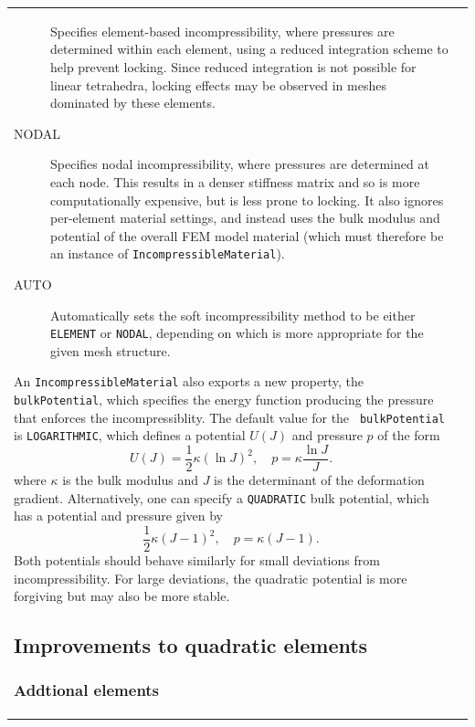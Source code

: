 \documentclass{article}
\begin{document}
\begin{tabular}{ll}
\begin{description}
Specifies element-based incompressibility,
where pressures are determined within each element, using a reduced
integration scheme to help prevent locking. Since
reduced integration is not possible for linear tetrahedra,
locking effects may be observed in meshes dominated by these elements.

\item[NODAL] \mbox{}
 
Specifies nodal incompressibility, where pressures are
determined at each node. This results in a denser stiffness
matrix and so is more computationally expensive, but is
less prone to locking. It also ignores
per-element material settings, and instead uses the bulk modulus
and potential of the overall FEM model material (which
must therefore be an instance of {\tt IncompressibleMaterial}).

\item[AUTO] \mbox{}

Automatically sets the soft incompressibility method to be either
{\tt ELEMENT} or {\tt NODAL}, depending on which is
more appropriate for the given mesh structure.

\end{description}

An {\tt IncompressibleMaterial} also exports a new property, the {\tt
bulkPotential}, which specifies the energy function producing the
pressure that enforces the incompressiblity. The default value for the {\tt
bulkPotential} is {\tt LOGARITHMIC}, which defines a potential $U(J)$
and pressure $p$ of the form
\[
U(J) = \frac{1}{2} \kappa (\ln J)^2, \quad p = \kappa \frac{\ln J}{J}.
\]
where $\kappa$ is the bulk modulus and
$J$ is the determinant of the deformation gradient.
Alternatively, one can specify a {\tt QUADRATIC}
bulk potential, which has a potential and pressure given by
\[
\frac{1}{2} \kappa (J-1)^2, \quad p = \kappa (J - 1).
\]
Both potentials should behave similarly for small deviations from
incompressibility. For large deviations, the quadratic potential is
more forgiving but may also be more stable.

\subsection*{Improvements to quadratic elements}

\subsubsection*{Addtional elements}


\end{tabular}
\end{document}
